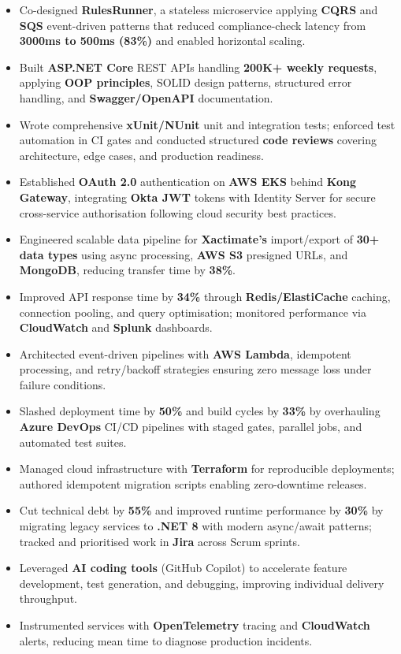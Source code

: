 \documentclass[a4paper,10pt]{article}
\begin{document}
\begin{itemize}[leftmargin=*]
    \item Co-designed \textbf{RulesRunner}, a stateless microservice applying \textbf{CQRS} and \textbf{SQS} event-driven patterns that reduced compliance-check latency from \textbf{3000ms to 500ms (83\%)} and enabled horizontal scaling.
    \item Built \textbf{ASP.NET Core} REST APIs handling \textbf{200K+ weekly requests}, applying \textbf{OOP principles}, SOLID design patterns, structured error handling, and \textbf{Swagger/OpenAPI} documentation.
    \item Wrote comprehensive \textbf{xUnit/NUnit} unit and integration tests; enforced test automation in CI gates and conducted structured \textbf{code reviews} covering architecture, edge cases, and production readiness.
    \item Established \textbf{OAuth 2.0} authentication on \textbf{AWS EKS} behind \textbf{Kong Gateway}, integrating \textbf{Okta JWT} tokens with Identity Server for secure cross-service authorisation following cloud security best practices.
    \item Engineered scalable data pipeline for \textbf{Xactimate's} import/export of \textbf{30+ data types} using async processing, \textbf{AWS S3} presigned URLs, and \textbf{MongoDB}, reducing transfer time by \textbf{38\%}.
    \item Improved API response time by \textbf{34\%} through \textbf{Redis/ElastiCache} caching, connection pooling, and query optimisation; monitored performance via \textbf{CloudWatch} and \textbf{Splunk} dashboards.
    \item Architected event-driven pipelines with \textbf{AWS Lambda}, idempotent processing, and retry/backoff strategies ensuring zero message loss under failure conditions.
    \item Slashed deployment time by \textbf{50\%} and build cycles by \textbf{33\%} by overhauling \textbf{Azure DevOps} CI/CD pipelines with staged gates, parallel jobs, and automated test suites.
    \item Managed cloud infrastructure with \textbf{Terraform} for reproducible deployments; authored idempotent migration scripts enabling zero-downtime releases.
    \item Cut technical debt by \textbf{55\%} and improved runtime performance by \textbf{30\%} by migrating legacy services to \textbf{.NET 8} with modern async/await patterns; tracked and prioritised work in \textbf{Jira} across Scrum sprints.
    \item Leveraged \textbf{AI coding tools} (GitHub Copilot) to accelerate feature development, test generation, and debugging, improving individual delivery throughput.
    \item Instrumented services with \textbf{OpenTelemetry} tracing and \textbf{CloudWatch} alerts, reducing mean time to diagnose production incidents.
\end{itemize}
\end{document}
